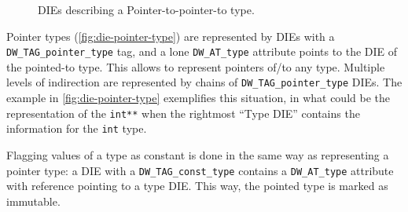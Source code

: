 \begin{figure}
  \centering
  \caption{DIEs describing a Pointer-to-pointer-to type.}
  \label{fig:die-pointer-type}
\end{figure}

Pointer types (\autoref{fig:die-pointer-type}) are represented by DIEs with
a \verb|DW_TAG_pointer_type| tag, and a lone \verb|DW_AT_type| attribute
points to the DIE of the pointed-to type. This allows to represent pointers
of/to any type. Multiple levels of indirection are represented by chains of
\verb|DW_TAG_pointer_type| DIEs. The example in \autoref{fig:die-pointer-type}
exemplifies this situation, in what could be the representation of the
\texttt{int**} when the rightmost “Type DIE” contains the information
for the \texttt{int} type.



Flagging values of a type as constant is done in the same way as representing
a pointer type: a DIE with a \verb|DW_TAG_const_type| contains
a \verb|DW_AT_type| attribute with reference pointing to a type DIE.
This way, the pointed type is marked as immutable.



